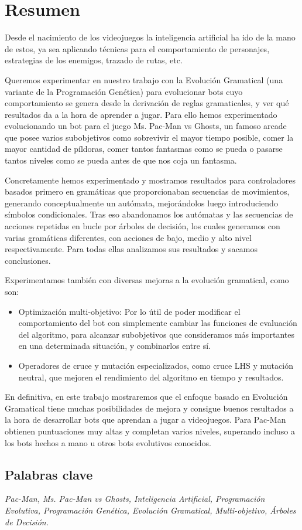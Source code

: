 \chapter{Resumen} \label{cap:resumen}
Desde el nacimiento de los videojuegos la inteligencia artificial ha ido de la mano de estos, ya sea aplicando técnicas para el comportamiento de personajes, estrategias de los enemigos, trazado de rutas, etc.

Queremos experimentar en nuestro trabajo con la Evolución Gramatical (una variante de la Programación Genética) para evolucionar bots cuyo comportamiento se genera desde la derivación de reglas gramaticales, y ver qué resultados da a la hora de aprender a jugar. Para ello hemos experimentado evolucionando un bot para el juego Ms. Pac-Man vs Ghosts, un famoso arcade que posee varios subobjetivos como sobrevivir el mayor tiempo posible, comer la mayor cantidad de píldoras, comer tantos fantasmas como se pueda o pasarse tantos niveles como se pueda antes de que nos coja un fantasma.
 
Concretamente hemos experimentado y mostramos resultados para controladores basados primero en gramáticas que proporcionaban secuencias de movimientos, generando conceptualmente un autómata, mejorándolos luego introduciendo símbolos condicionales. 
Tras eso abandonamos los autómatas y las secuencias de acciones repetidas en bucle por árboles de decisión, los cuales generamos con varias gramáticas diferentes, con acciones de bajo, medio y alto nivel respectivamente. Para todas ellas analizamos sus resultados y sacamos conclusiones. 
 
Experimentamos también con diversas mejoras a la evolución gramatical, como son:
\begin{itemize}
\item Optimización multi-objetivo: Por lo útil de poder modificar el comportamiento del bot con simplemente cambiar las funciones de evaluación del algoritmo, para alcanzar subobjetivos que consideramos más importantes en una determinada situación, y combinarlos entre sí.
\item Operadores de cruce y mutación especializados, como cruce LHS y mutación neutral, que mejoren el rendimiento del algoritmo en tiempo y resultados.
\end{itemize}
 
En definitiva, en este trabajo mostraremos que el enfoque basado en Evolución Gramatical tiene muchas posibilidades de mejora y consigue buenos resultados a la hora de desarrollar bots que aprendan a jugar a videojuegos. Para Pac-Man obtienen puntuaciones muy altas y completan varios niveles, superando incluso a los bots hechos a mano u otros bots evolutivos conocidos.

\section{Palabras clave}
\textit{Pac-Man, Ms. Pac-Man vs Ghosts, Inteligencia Artificial, Programación Evolutiva, Programación Genética, Evolución Gramatical, Multi-objetivo, Árboles de Decisión.}
